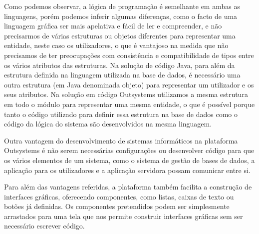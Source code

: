 Como podemos observar, a lógica de programação é semelhante em ambas as linguagens, porém podemos inferir algumas diferenças, como o facto de uma linguagem gráfica ser mais apelativa e fácil de ler e compreender, e não precisarmos de várias estruturas ou objetos diferentes para representar uma entidade, neste caso os utilizadores, o que é vantajoso na medida que não precisamos de ter preocupações com consistência e compatibilidade de tipos entre os vários atributos das estruturas. Na solução de código Java, para além da estrutura definida na linguagem utilizada na base de dados, é necessário uma outra estrutura (em Java denominada objeto) para representar um utilizador e os seus atributos. Na solução em código Outsystems utilizamos a mesma estrutura em todo o módulo para representar uma mesma entidade, o que é possível porque tanto o código utilizado para definir essa estrutura na base de dados como o código da lógica do sistema são desenvolvidos na mesma linguagem.\par
Outra vantagem do desenvolvimento de sistemas informáticos na plataforma Outsystems é não serem necessárias configurações ou desenvolver código para que os vários elementos de um sistema, como o sistema de gestão de bases de dados, a aplicação para os utilizadores e a aplicação servidora possam comunicar entre si.\par
Para além das vantagens referidas, a plataforma também facilita a construção de interfaces gráficas, oferecendo componentes, como listas, caixas de texto ou botões já definidas. Os componentes pretendidos podem ser simplesmente arrastados para uma tela que nos permite construir interfaces gráficas sem ser necessário escrever código.\par


